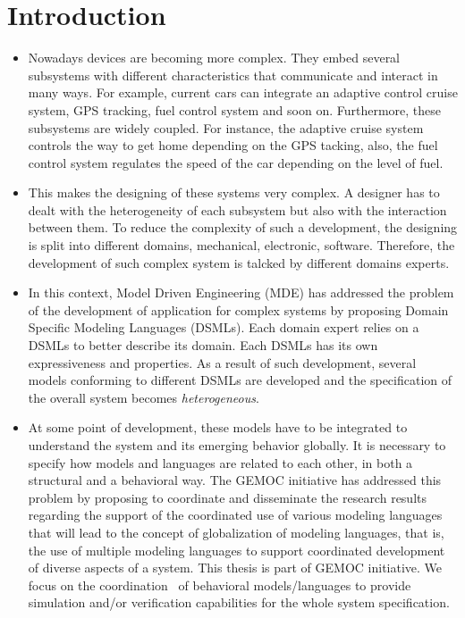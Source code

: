 \chapter{Introduction}


\begin{itemize}
	
	\item Nowadays devices are becoming more complex. They embed several subsystems with different characteristics that communicate and interact in many ways. For example, current cars can integrate an adaptive control cruise system, GPS tracking, fuel control system and soon on. Furthermore, these subsystems are widely coupled. For instance, the adaptive cruise system controls the way to get home depending on the GPS tacking, also, the fuel control system regulates the speed of the car depending on the level of fuel.
	
	\item This makes the designing of these systems very complex. A designer has to dealt with the heterogeneity of each subsystem but also with the interaction between them. To reduce the complexity of such a development, the designing is split into different domains, \eg mechanical, electronic, software. Therefore, the development of such complex system is talcked by different domains experts.
	
	\item In this context, Model Driven Engineering (MDE) has addressed the problem of the development of application for complex systems by proposing Domain Specific Modeling Languages (DSMLs). Each domain expert relies on a DSMLs to better describe its domain. Each DSMLs has its own expressiveness and properties. As a result of such development, several models conforming to different DSMLs are developed and the specification of the overall system becomes \emph{heterogeneous}.
	\item At some point of development, these models have to be integrated to understand the system and its emerging behavior globally. It is necessary to specify how models and languages are related to each other, in both a structural and a behavioral way. The GEMOC initiative has addressed this problem by proposing to coordinate and disseminate the research results regarding the support of the coordinated use of various modeling languages that will lead to the concept of globalization of modeling languages, that is, the use of multiple modeling languages to support coordinated development of diverse aspects of a system. This thesis is part of GEMOC initiative. We focus on the coordination~\cite{coordsignibib} of behavioral models/languages to provide simulation and/or verification capabilities for the whole system specification. 
	

\end{itemize}
